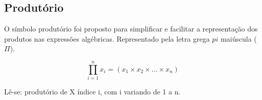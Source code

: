 





\subsection{Produtório}

O símbolo produtório foi proposto para simplificar e facilitar a representação dos produtos nas expressões algébricas. Representado pela letra grega $pi$ maiúscula ($\Pi$).


\begin{equation}\label{}
    \prod_{i=1}^{n}x_{i} = (x_{1} \times x_{2} \times  \ldots \times x_{n})
\end{equation}


Lê-se: produtório de X índice i, com i variando de 1 a n.

\vskip0.3cm

